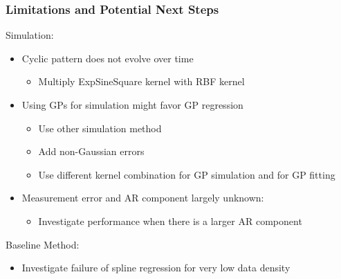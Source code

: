 \documentclass[
	8pt, %
]{beamer}
\begin{document}
\begin{frame}
\end{frame}



\begin{frame}
	\frametitle{Limitations and Potential Next Steps}

	Simulation:
	\begin{itemize}
		\item Cyclic pattern does not evolve over time
		\begin{itemize}
			\item Multiply ExpSineSquare kernel with RBF kernel
		\end{itemize}
		\item Using GPs for simulation might favor GP regression
		\begin{itemize}
			\item Use other simulation method
			\item Add non-Gaussian errors
			\item Use different kernel combination for GP simulation and for
			GP fitting
		\end{itemize}
		\item Measurement error and AR component largely unknown:
		\begin{itemize}
			\item Investigate performance when there is a larger AR component
		\end{itemize}

	\end{itemize}

	\bigskip

	Baseline Method:
	\begin{itemize}
		\item Investigate failure of spline regression for very low data density
	\end{itemize}

\end{frame}




%
%
\end{document}
